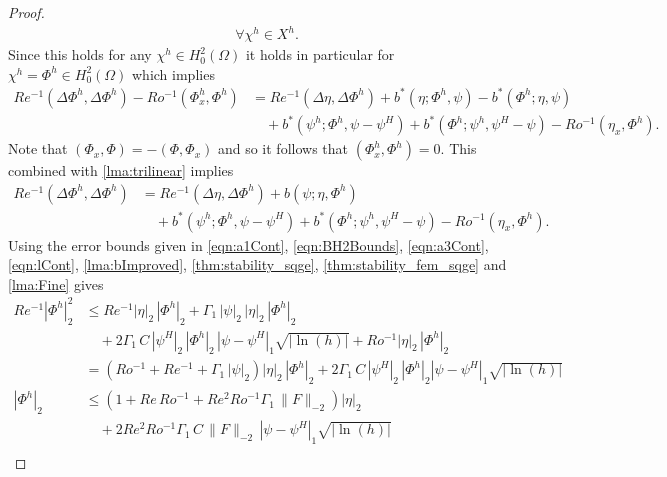 \begin{proof}
\begin{equation*}
\begin{split}
      \quad \forall \chi^h \in X^h.
    \end{split}
  \end{equation*}
  Since this holds for any $\chi^h\in H^2_0(\Omega)$ it holds in particular for
  $\chi^h=\Phi^h\in H^2_0(\Omega)$ which implies
  \begin{equation*}
    \begin{split}
      Re^{-1} (\Delta \Phi^h, \Delta \Phi^h) - Ro^{-1} (\Phi^h_x,\Phi^h)
        &= Re^{-1} (\Delta \eta, \Delta \Phi^h)
        + b^*(\eta;\Phi^h, \psi) - b^*(\Phi^h;\eta,\psi) \\
      &\quad+ b^*(\psi^h;\Phi^h,\psi-\psi^H) + b^*(\Phi^h; \psi^h,\psi^H-\psi)
        - Ro^{-1} (\eta_x,\Phi^h).
    \end{split}
  \end{equation*}
  Note that $(\Phi_x,\Phi) = -(\Phi,\Phi_x)$ and so it follows that
  $(\Phi^h_x,\Phi^h) = 0$. This combined with \autoref{lma:trilinear} implies
  \begin{equation*}
    \begin{split}
      Re^{-1} (\Delta \Phi^h, \Delta \Phi^h) &= Re^{-1} (\Delta \eta, \Delta \Phi^h)
        + b(\psi;\eta,\Phi^h) \\
      &\quad+ b^*(\psi^h;\Phi^h,\psi-\psi^H) + b^*(\Phi^h; \psi^h,\psi^H-\psi)
        - Ro^{-1} (\eta_x,\Phi^h).
    \end{split}
  \end{equation*}
  Using the error bounds given in \eqref{eqn:a1Cont}, \eqref{eqn:BH2Bounds},
  \eqref{eqn:a3Cont}, \eqref{eqn:lCont}, \autoref{lma:bImproved},
  \autoref{thm:stability_sqge}, \autoref{thm:stability_fem_sqge} and
  \autoref{lma:Fine} gives
  \begin{align*}
    Re^{-1} |\Phi^h|_2^2 &\le Re^{-1} |\eta|_2\, |\Phi^h|_2 + \Gamma_1\, |\psi|_2\, |\eta|_2\, |\Phi^h|_2 \\
      &\quad+ 2 \Gamma_1\, C\, |\psi^H|_2\, |\Phi^h|_2\, |\psi - \psi^H|_1 \sqrt{|\ln(h)|} + Ro^{-1}
        |\eta|_2\, |\Phi^h|_2 \\
    &= \left(Ro^{-1} + Re^{-1} + \Gamma_1\, |\psi|_2\right) |\eta|_2\, |\Phi^h|_2 + 2 \Gamma_1\, C\,
      |\psi^H|_2\, |\Phi^h|_2 |\psi - \psi^H|_1 \sqrt{|\ln(h)|}  \\
    |\Phi^h|_2 &\le \left(1 + Re\, Ro^{-1} + Re^2 Ro^{-1} \Gamma_1\, \|F\|_{-2}\right) |\eta|_2 \\
      &\quad + 2 Re^2 Ro^{-1} \Gamma_1\, C\, \|F\|_{-2}\, |\psi - \psi^H|_1 \sqrt{|\ln(h)|} \\
  \end{align*}

\end{proof}
